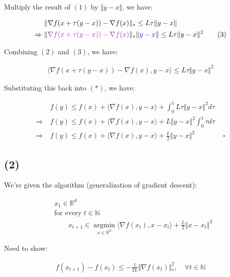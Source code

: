 \documentclass{article}
\begin{document}
Multiply the result of $(1)$ by $\Vert y - x \Vert$, we have:

\begin{align*}
    &\Vert \nabla f ( x + \tau ( y - x ) ) - \nabla f ( x ) \Vert_* \leq L \tau \Vert y - x \Vert \\
    \Rightarrow \ &\Vert \textcolor{Purple}{\nabla f ( x + \tau ( y - x ) ) - \nabla f ( x )} \Vert_* \Vert \textcolor{blue}{y - x} \Vert \leq L \tau \Vert y - x \Vert^2 \tag{3}
\end{align*}

Combining $(2)$ and $(3)$, we have:

\begin{align*}
    \langle \nabla f ( x + \tau ( y - x ) ) - \nabla f ( x ), y - x \rangle \leq L \tau \Vert y - x \Vert^2
\end{align*}

Substituting this back into $(*)$, we have:

\begin{align*}
    &f(y) \leq f(x) + \langle \nabla f (x), y - x \rangle + \int_0^1 L \tau \Vert y - x \Vert^2 d\tau \\
    \Rightarrow \ &f(y) \leq f(x) + \langle \nabla f (x), y - x \rangle + L \Vert y - x \Vert^2 \int_0^1 \tau d\tau \\
    \Rightarrow \ &f(y) \leq f(x) + \langle \nabla f (x), y - x \rangle + \frac{L}{2} \Vert y - x \Vert^2 \qquad \qquad \square
\end{align*}

\subsection*{(2)}

We're given the algorithm (generalization of gradient descent):

\begin{align*}
    &x_1 \in \mathbb{R}^d \\
    &\text{for every } t \in \mathbb{N} \\
    &\qquad x_{t + 1} \in \underset{x \in \mathbb{R}^d}{\operatorname{argmin}} \langle \nabla f ( x_t ), x - x_t \rangle + \frac{L}{2} \Vert x - x_t \Vert^2 
\end{align*}

Need to show:

\begin{align*}
    f ( x_{t + 1} ) - f ( x_t ) \leq - \frac{1}{2 L} \Vert \nabla f ( x_t ) \Vert_*^2 , \quad \forall t \in \mathbb{N} 
\end{align*}
\end{document}
